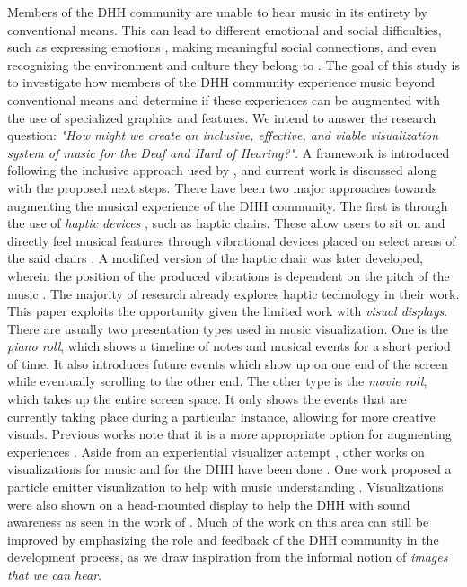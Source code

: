 \documentclass{sigchi-ext}
\begin{document}
Members of the DHH community are unable to hear music in its entirety by conventional means. This can lead to different emotional and social difficulties, such as expressing emotions \cite{Walker:2013, Nelson:2016}, making meaningful social connections, and even recognizing the environment and culture they belong to \cite{Ribiero:2017, Gfeller:2012}. The goal of this study is to investigate how members of the DHH community experience music beyond conventional means and determine if these experiences can be augmented with the use of specialized graphics and features.  We intend to answer the research question: \textit{"How might we create an inclusive, effective, and viable visualization system of music for the Deaf and Hard of Hearing?"}. A framework is introduced following the inclusive approach used by \cite{deja2019myosl}, and current work is discussed along with the proposed next steps. There have been two major approaches towards augmenting the musical experience of the DHH community. The first is through the use of \textit{haptic devices} \cite{Balandra:2016}, such as haptic chairs. These allow users to sit on and directly feel musical features through vibrational devices placed on select areas of the said chairs \cite{Nanayakkara:2009:EME}. A modified version of the haptic chair was later developed, wherein the position of the produced vibrations is dependent on the pitch of the music \cite{Jack:2015}. The majority of research already explores haptic technology in their work. This paper exploits the opportunity given the limited work with \textit{visual displays}.
There are usually two presentation types used in music visualization. One is the \textit{piano roll}, which shows a timeline of notes and musical events for a short period of time. It also introduces future events which show up on one end of the screen while eventually scrolling to the other end. The other type is the \textit{movie roll}, which takes up the entire screen space. It only shows the events that are currently taking place during a particular instance, allowing for more creative visuals. Previous works note that it is a more appropriate option for augmenting experiences \cite{Nanayakkara:2007}. Aside from an experiential visualizer attempt \cite{Nanayakkara:2007}, other works on visualizations for music and for the DHH have been done \cite{Fonteles:2013,Jain:2015,Petry:2016}. One work proposed a particle emitter visualization to help with music understanding \cite{Fonteles:2013}. Visualizations were also shown on a head-mounted display to help the DHH with sound awareness as seen in the work of \cite{Jain:2015}. Much of the work on this area can still be improved by emphasizing the role and feedback of the DHH community in the development process, as we draw inspiration from the informal notion of \textit{images that we can hear}.
\end{document}
